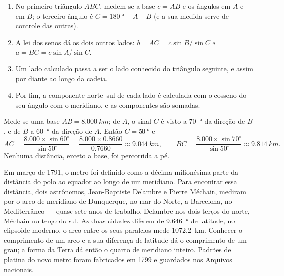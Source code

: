 \begin{method}\label{met:g10:measuring-the-earth:chain}
\begin{enumerate}
  \item No primeiro triângulo $ABC$, medem-se a base $c = AB$ e os ângulos
        em $A$ e em $B$; o terceiro ângulo é
        $C = \qty{180}{\degree} - A - B$ (e a sua medida serve de controle
        das outras).
  \item A lei dos senos dá os dois outros lados:
        $b = AC = c \sin B / \sin C$ e $a = BC = c \sin A / \sin C$.
  \item Um lado calculado passa a ser o lado conhecido do triângulo
        seguinte, e assim por diante ao longo da cadeia.
  \item Por fim, a componente norte--sul de cada lado é calculada com o
        cosseno do seu ângulo com o meridiano, e as componentes são somadas.
\end{enumerate}
\end{method}

\begin{example}[Um triângulo]\label{ex:g10:measuring-the-earth:triangle}
Mede-se uma base $AB = \qty{8.000}{km}$; de $A$, o sinal $C$ é visto a
\qty{70}{\degree} da direção de $B$, e de $B$ a \qty{60}{\degree} da
direção de $A$. Então $C = \qty{50}{\degree}$ e
\[
  AC = \frac{8.000 \times \sin 60^\circ}{\sin 50^\circ} = \frac{8.000 \times 0.8660}{0.7660}
  \approx \qty{9.044}{km}, \qquad
  BC = \frac{8.000 \times \sin 70^\circ}{\sin 50^\circ} \approx \qty{9.814}{km}.
\]
Nenhuma distância, exceto a base, foi percorrida a pé.
\end{example}

\begin{example}\label{ex:g10:measuring-the-earth:meridian}
Em março de 1791, o metro foi definido como a décima milionésima parte da
distância do polo ao equador ao longo de um meridiano. Para encontrar essa
distância, dois astrônomos, Jean-Baptiste Delambre e Pierre Méchain,
mediram por  o arco de meridiano de Dunquerque, no mar do
Norte, a Barcelona, no Mediterrâneo --- quase sete anos de trabalho,
Delambre nos dois terços do norte, Méchain no terço do sul. As duas cidades
diferem de \qty{9.646}{\degree} de latitude; no elipsoide moderno, o arco
entre os seus paralelos mede \qty{1072.2}{km}. Conhecer o comprimento de um
arco e a sua diferença de latitude dá o comprimento de um grau; a forma da
Terra dá então o quarto de meridiano inteiro. Padrões de platina do novo
metro foram fabricados em 1799 e guardados nos Arquivos nacionais.
\end{example}

